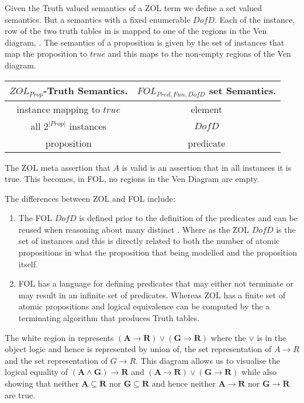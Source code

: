Given the  Truth valued semantics of a ZOL term  we  define  a set valued semantics. But a semantics with a fixed enumerable $DofD$. 
Each of the  instance, row of the two truth tables in   is mapped to one of the regions in the Ven diagram, . The semantics of a proposition is given by the set of instances that map the proposition to $true$ and this maps to the non-empty regions of the Ven diagram.



\begin{center}\begin{tabular}{|c|c|}
\hline
\quad $ZOL_{Prop}$-Truth Semantics\quad . & \quad $FOL_{Pred,Fun,DofD}$ set Semantics\quad . \\ \hline
instance mapping to $true$ & element \\ \hline
all $2^{|Prop|}$ instances & $DofD$ \\ \hline
proposition & predicate \\ \hline 
\end{tabular}\end{center}

The ZOL meta assertion that $A$ is valid is an assertion that in all instances it is true.  This becomes, in FOL, no regions in the Ven Diagram are empty.

The differences between ZOL and FOL include:
\begin{enumerate}
\item The FOL $DofD$ is defined prior to the definition of the predicates and can be reused when reasoning about many distinct . Where as the ZOL $DofD$ is the set of instances and this is directly related to both the number of atomic  propositions in what the proposition that  being modelled and the proposition itself.

\item FOL has a language for defining predicates that may either not terminate or may result in an infinite set of predicates. Whereas ZOL has a finite set of atomic propositions and logical equivalence can be computed by the a terminating algorithm that produces  Truth tables. 

\end{enumerate}






 



The white region in   represents  
$ \mathbf{(A\rightarrow R)\vee (G\rightarrow R)}$ where the $\vee$ is in the object logic and hence is represented by union of, the set representation of $A\rightarrow R$ and  the set representation of $G\rightarrow R$. This diagram allows us to visualise the logical equality of $\mathbf{(A\wedge G)   \rightarrow R}$ and 
$ \mathbf{(A\rightarrow R)\vee (G\rightarrow R)}$ while also showing that neither $\mathbf{A\subseteq R}$ nor $\mathbf{G\subseteq R}$ and hence neither $\mathbf{A\rightarrow R}$ nor $\mathbf{G\rightarrow R}$ are true.  



